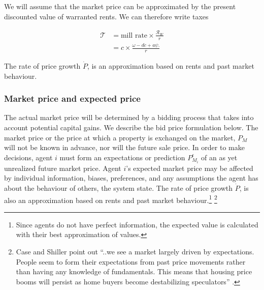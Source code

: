 We will assume that the market price can be approximated by the present discounted value of warranted  rents.  We can therefore write taxes

\begin{align*}
\mathcal{T} &= \text{mill rate} \times \frac{\mathcal{R}_W}{r} \\
&= c \times \frac{\omega- {dc} + a\psi.}{r}
\end{align*}


The rate of price growth $\dot P$, is an approximation based on rents and past market behaviour.

\subsubsection{Market price and expected price} \label{section-market-price}

The actual market price will be determined by a bidding process that takes into account potential capital gains.  We describe the bid price formulation below. The \gls{market price} or the price at which a property is exchanged on the market, $P_M$ will not be known in advance, nor will the future sale price. In order to make decisions, agent $i$ must form an \glspl{expectation} or   prediction $P_{M_i}^{\epsilon}$ of an as yet unrealized future market price. Agent $i$'s expected market price  may be affected by individual information, biases, preferences, and any assumptions the agent has about the behaviour of others, the system state. The rate of price growth $\dot P$, is also an approximation based on rents and past market behaviour.\footnote{Since  agents do not have perfect information, the expected value  is calculated with their best approximation of values.} 
 \footnote{Case and Shiller point out ``..we see a market largely driven by expectations. People seem to form their expectations from past price movements rather than having any knowledge of fundamentals. This means that housing price booms will persist as home buyers become destabilizing speculators''  \cite{caseThereBubbleHousing2003}.} 






